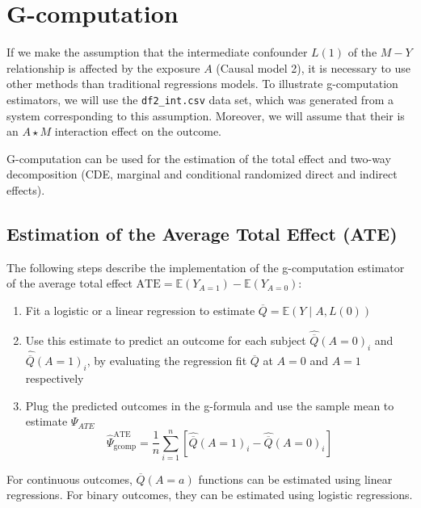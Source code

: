 \documentclass[
]{book}
\begin{document}
\hypertarget{ChapGcomp}{%
\chapter{G-computation}\label{ChapGcomp}}

If we make the assumption that the intermediate confounder \(L(1)\) of the \(M-Y\) relationship is affected by the exposure \(A\) (Causal model 2), it is necessary to use other methods than traditional regressions models. To illustrate g-computation estimators, we will use the \texttt{df2\_int.csv} data set, which was generated from a system corresponding to this assumption. Moreover, we will assume that their is an \(A \star M\) interaction effect on the outcome.

G-computation can be used for the estimation of the total effect and two-way decomposition (CDE, marginal and conditional randomized direct and indirect effects).

\hypertarget{estimation-of-the-average-total-effect-ate-1}{%
\section{Estimation of the Average Total Effect (ATE)}\label{estimation-of-the-average-total-effect-ate-1}}

The following steps describe the implementation of the g-computation estimator of the average total effect \(\text{ATE} = \mathbb{E}(Y_{A=1}) - \mathbb{E}(Y_{A=0})\):

\begin{enumerate}
\def\labelenumi{\arabic{enumi}.}
\item
  Fit a logistic or a linear regression to estimate \(\overline{Q} = \mathbb{E}(Y \mid A, L(0))\)
\item
  Use this estimate to predict an outcome for each subject \(\hat{\overline{Q}}(A=0)_i\) and \(\hat{\overline{Q}}(A=1)_i\), by evaluating the regression fit \(\overline{Q}\) at \(A=0\) and \(A=1\) respectively
\item
  Plug the predicted outcomes in the g-formula and use the sample mean to estimate \(\Psi_{ATE}\)
  \begin{equation}
  \hat{\Psi}^{\text{ATE}}_{\text{gcomp}} = \frac{1}{n} \sum_{i=1}^n \left[ \hat{\overline{Q}}(A=1)_i - \hat{\overline{Q}}(A=0)_i \right]
  \end{equation}
\end{enumerate}

For continuous outcomes, \(\overline{Q}(A=a)\) functions can be estimated using linear regressions. For binary outcomes, they can be estimated using logistic regressions.
\end{document}
